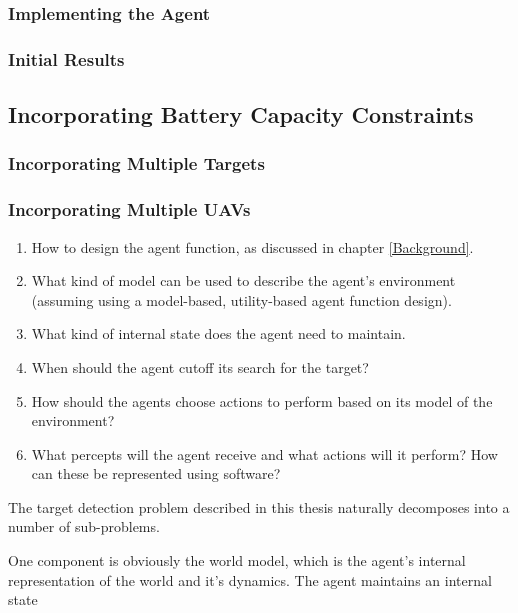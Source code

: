 \subsubsection{Implementing the Agent}
\placeholder

\subsubsection{Initial Results}
\placeholder

\subsection{Incorporating Battery Capacity Constraints}
\placeholder

\subsubsection{Incorporating Multiple Targets}
\placeholder

\subsubsection{Incorporating Multiple UAVs}
\placeholder



\begin{enumerate}
    \item How to design the agent function, as discussed in chapter \ref{Background}.
    \item What kind of model can be used to describe the agent's environment (assuming using a model-based, utility-based agent function design).
    \item What kind of internal state does the agent need to maintain.
    \item When should the agent cutoff its search for the target?
    \item How should the agents choose actions to perform based on its model of the environment?
    \item What percepts will the agent receive and what actions will it perform? How can these be represented using software?
\end{enumerate}

The target detection problem described in this thesis naturally decomposes into a number of sub-problems. %

One component is obviously the world model, which is the agent's internal representation of the world and it's dynamics. The agent maintains an internal state
